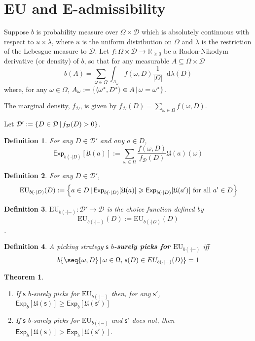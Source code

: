 \documentclass[a4paper]{article}
\newtheorem{theorem}{Theorem}
\newtheorem{definition}{Definition}
\newcommand\D{\mathcal{D}}
\newcommand\s{\mathsf{s}}
\newcommand\Exp{\mathsf{Exp}}
\newcommand\EU{\mathrm{EU}}
\newcommand\U{\mathfrak{U}} %
\newcommand{\pb}{b}
\newcommand\SetDelimiter[1][]{
	\nonscript\,#1\vert \allowbreak \nonscript\,\mathopen{}}
\providecommand\given{\SetDelimiter}
\newcommand*\diff{\mathop{}\!\mathrm{d}}
\renewcommand{\geq}{\geqslant}
\newenvironment{CCM rewritten}
{\begingroup\color{blue}} %
{\endgroup}              %
\begin{document}
\section{EU and E-admissibility}



Suppose $b$ is probability measure over $\Omega\times\D$ which is absolutely continuous with respect to $u\times\lambda$, where $u$ is the uniform distribution on $\Omega$ and $\lambda$ is the restriction of the Lebesgue measure to $\D$. Let $f:\Omega\times\D\rightarrow\mathbb{R}_{\geq0}$ be a Radon-Nikodym derivative (or density) of $b$, so that for any measurable $A\subseteq\Omega\times\D$
\[
b(A)=\sum_{\omega\in\Omega}\int_{A_\omega} f(\omega,D) \frac{1}{|\Omega|}\diff\lambda(D)
\]
where, for any $\omega\in\Omega$, $A_\omega:=\left\{\left<\omega^*,D^*\right>\in A\given \omega=\omega^*\right\}$.

The marginal density, $f_\D$, is given by $f_\D(D)=\sum_{\omega\in\Omega}f(\omega,D)$. 

	
Let $\D':=\{D\in\D\given f_\D(D)>0\}$.

\begin{definition}
	For any $D\in\D'$ and any $a\in D$, \[\Exp_{\pb(\cdot|D)}[\U(a)]:=\displaystyle\sum_{\omega\in\Omega}\frac{f(\omega,D)}{f_\D(D)}\U(a)(\omega)\]
\end{definition}
	
	
\begin{definition}
	For any $D\in\D'$, \[\EU_{\pb(\cdot|D)}(D):=\left\{a\in D\given \Exp_{\pb(\cdot|D)}[\U(a)]\geq\Exp_{\pb(\cdot|D)}[\U(a')]\text{ for all $a'\in D$}\right\}\]
\end{definition}

	
\begin{definition}
	$\EU_{\pb(\cdot|-)}:\D'\rightarrow\D$ is the choice function defined by \[\EU_{\pb(\cdot|-)}(D):=\EU_{\pb(\cdot|D)}(D)\].
\end{definition}

\begin{definition}
A picking strategy $\s$ \textbf{$\pb$-surely picks for $\EU_{\pb(\cdot|-)}$} iff \[\pb\{\seq{\omega,D}\given\omega\in\Omega,\, \s(D)\in EU_{\pb(\cdot|-)}(D)\}=1\]
\end{definition}


\begin{theorem}\label{thm:EU appendix} 
\hspace*{1mm}
	\begin{enumerate}[{\normalfont (i)}]
		\item  If $\s$ $\pb$-surely picks for $\EU_{\pb(\cdot|-)}$ then, for any $\s'$, $\Exp_\pb[\U(\s)]\geq\Exp_\pb[\U(\s')]$
		\item  If $\s$ $\pb$-surely picks for $\EU_{\pb(\cdot|-)}$ and $\s'$ does not, then $\Exp_\pb[\U(\s)]>\Exp_\pb[\U(\s')]$.
	\end{enumerate}
\end{theorem}
\end{document}
